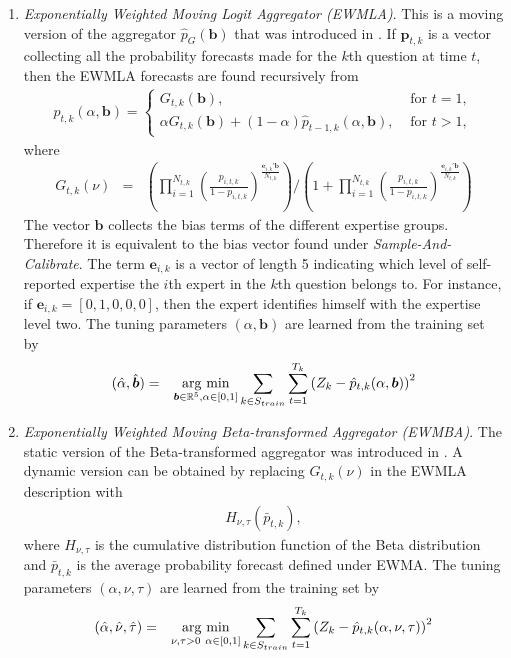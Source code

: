 \documentclass[aoas, preprint]{imsart}
\newcommand{\argmin}{\operatornamewithlimits{arg\ min}}
\numberwithin{equation}{section}
\theoremstyle{plain}
\newcommand{\R}{\mathbb{R}}
\begin{document}
\begin{enumerate}
\begin{enumerate}
 
\item  \textit{Exponentially Weighted Moving Logit Aggregator (EWMLA)}. This is a moving version of the aggregator $\hat{p}_G(\boldsymbol{b})$ that was introduced in \cite{satopaa}. If $\boldsymbol{p}_{t,k}$ is a vector collecting all the probability forecasts made for the $k$th question at time $t$, then the EWMLA forecasts are found recursively from
\begin{eqnarray*}
\hat{p}_{t,k}(\alpha, \boldsymbol{b}) =
\begin{cases}
G_{t,k}(\boldsymbol{b} ), & \text{ for } t  = 1, \\
\alpha G_{t,k}(\boldsymbol{b} )  + (1-\alpha) \hat{p}_{t-1,k}(\alpha, \boldsymbol{b}),  & \text{ for } t > 1,
\end{cases}
\end{eqnarray*}
where
\small
\begin{eqnarray*}
G_{t,k}(\nu )  &=& \left( \prod\limits_{i=1}^{N_{t,k}} \left( \frac{p_{i, t, k}}{1-p_{i, t, k}} \right)^{ \frac{\boldsymbol{e}_{i,k}'\boldsymbol{b}}{N_{t,k}}} \right) \Bigg/ \left(1+ \prod\limits_{i=1}^{N_{t,k}} \left( \frac{p_{i, t, k}}{1-p_{i, t, k}} \right)^{\frac{\boldsymbol{e}_{i,k}' \boldsymbol{b}}{N_{t,k}}} \right)
\end{eqnarray*}
\normalsize
The vector $\boldsymbol{b}$ collects the bias terms of the different expertise groups. Therefore it is equivalent to the bias vector found under \textit{Sample-And-Calibrate}. The term $\boldsymbol{e}_{i,k}$ is a vector of length 5 indicating which level of self-reported expertise the $i$th expert in the $k$th question belongs to. For instance, if $\boldsymbol{e}_{i,k} = [0, 1, 0, 0, 0]$, then the expert identifies himself with the expertise level two. The tuning parameters $(\alpha, \boldsymbol{b})$ are learned from the training set by
\begin{eqnarray*}
(\hat{\alpha}, \hat{ \boldsymbol{b}}) &=& \argmin_{ \boldsymbol{b} \in \R^5, \alpha \in [0,1]} \sum_{k \in S_{train}} \sum_{t=1}^{T_k} \left(Z_k - \hat{p}_{t,k}(\alpha,  \boldsymbol{b})\right)^2
\end{eqnarray*}


\item  \textit{Exponentially Weighted Moving Beta-transformed Aggregator (EWMBA)}. The static version of the Beta-transformed  aggregator was introduced in \cite{Ranjan08}. A dynamic version can be obtained by replacing $G_{t,k}(\nu )$ in the EWMLA description with
\begin{eqnarray*}
H_{\nu, \tau} \left( \bar{p}_{t,k}\right),
\end{eqnarray*}
where $H_{\nu, \tau}$ is the cumulative distribution function of the Beta distribution and $\bar{p}_{t,k}$ is the average probability forecast defined under EWMA. The tuning parameters $(\alpha, \nu, \tau)$ are learned from the training set by
\begin{eqnarray*}
(\hat{\alpha}, \hat{\nu}, \hat{\tau}) &=& \argmin_{\nu, \tau > 0\ \alpha \in [0,1]} \sum_{k \in S_{train}} \sum_{t=1}^{T_k} \left(Z_k - \hat{p}_{t,k}(\alpha, \nu, \tau)\right)^2
\end{eqnarray*} 


\end{enumerate}
\end{enumerate}
\end{document}
